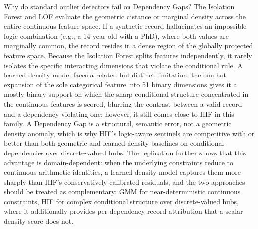 \documentclass[pdflatex,sn-mathphys-num]{sn-jnl}
\theoremstyle{thmstyleone}%
\theoremstyle{thmstyletwo}%
\theoremstyle{thmstylethree}%
\begin{document}
Why do standard outlier detectors fail on Dependency Gaps? The Isolation Forest and LOF evaluate the geometric distance or marginal density across the entire continuous feature space. If a synthetic record hallucinates an impossible logic combination (e.g., a 14-year-old with a PhD), where both values are marginally common, the record resides in a dense region of the globally projected feature space. Because the Isolation Forest splits features independently, it rarely isolates the specific interacting dimensions that violate the conditional rule. A learned-density model faces a related but distinct limitation: the one-hot expansion of the sole categorical feature into 51 binary dimensions gives it a mostly binary support on which the sharp conditional structure concentrated in the continuous features is scored, blurring the contrast between a valid record and a dependency-violating one; however, it still comes close to HIF in this family. A Dependency Gap is a structural, semantic error, not a geometric density anomaly, which is why HIF's logic-aware sentinels are competitive with or better than both geometric and learned-density baselines on conditional dependencies over discrete-valued hubs. The replication further shows that this advantage is domain-dependent: when the underlying constraints reduce to continuous arithmetic identities, a learned-density model captures them more sharply than HIF's conservatively calibrated residuals, and the two approaches should be treated as complementary: GMM for near-deterministic continuous constraints, HIF for complex conditional structure over discrete-valued hubs, where it additionally provides per-dependency record attribution that a scalar density score does not.
\end{document}
